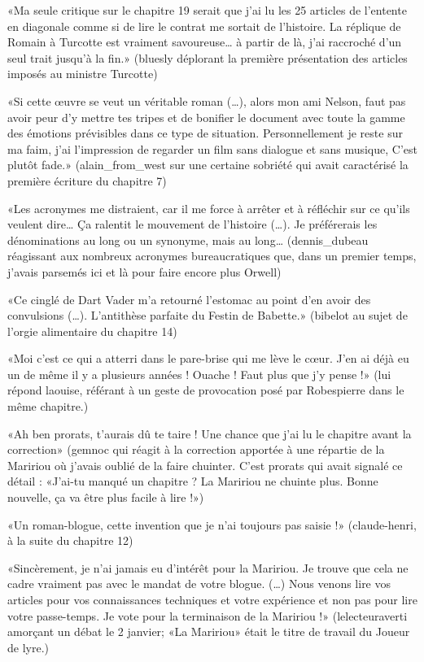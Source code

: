 \begin{Postface}
    «Ma seule critique sur le chapitre 19 serait que j’ai lu les 25 articles de l’entente en diagonale comme si de lire le contrat me sortait de l’histoire. La réplique de Romain à Turcotte est vraiment savoureuse… à partir de là, j’ai raccroché d’un seul trait jusqu’à la fin.» (bluesly déplorant la première présentation des articles imposés au ministre Turcotte)

    «Si cette œuvre se veut un véritable roman (…), alors mon ami Nelson, faut pas avoir peur d’y mettre tes tripes et de bonifier le document avec toute la gamme des émotions prévisibles dans ce type de situation. Personnellement je reste sur ma faim, j’ai l’impression de regarder un film sans dialogue et sans musique, C’est plutôt fade.» (alain_from_west sur une certaine sobriété qui avait caractérisé la première écriture du chapitre 7)

    «Les acronymes me distraient, car il me force à arrêter et à réfléchir sur ce qu’ils veulent dire… Ça ralentit le mouvement de l’histoire (…). Je préférerais les dénominations au long ou un synonyme, mais au long… (dennis_dubeau réagissant aux nombreux acronymes bureaucratiques que, dans un premier temps, j’avais parsemés ici et là pour faire encore plus Orwell)

    «Ce cinglé de Dart Vader m’a retourné l’estomac au point d’en avoir des convulsions (…). L’antithèse parfaite du Festin de Babette.» (bibelot au sujet de l’orgie alimentaire du chapitre 14)

    «Moi c’est ce qui a atterri dans le pare-brise qui me lève le cœur. J’en ai déjà eu un de même il y a plusieurs années ! Ouache ! Faut plus que j’y pense !» (lui répond laouise, référant à un geste de provocation posé par Robespierre dans le même chapitre.)

    «Ah ben prorats, t’aurais dû te taire ! Une chance que j’ai lu le chapitre avant la correction» (gemnoc qui réagit à la correction apportée à une répartie de la Maririou où j’avais oublié de la faire chuinter. C’est prorats qui avait signalé ce détail : «J’ai-tu manqué un chapitre ? La Maririou ne chuinte plus. Bonne nouvelle, ça va être plus facile à lire !»)

    «Un roman-blogue, cette invention que je n’ai toujours pas saisie !» (claude-henri, à la suite du chapitre 12)

    «Sincèrement, je n’ai jamais eu d’intérêt pour la Maririou. Je trouve que cela ne cadre vraiment pas avec le mandat de votre blogue. (…) Nous venons lire vos articles pour vos connaissances techniques et votre expérience et non pas pour lire votre passe-temps. Je vote pour la terminaison de la Maririou !» (lelecteuraverti amorçant un débat le 2 janvier; «La Maririou» était le titre de travail du Joueur de lyre.)


\end{Postface}
